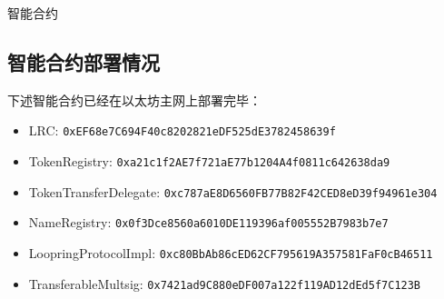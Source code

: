 \documentclass[UTF8]{ctexart}
\makeatletter
\newenvironment{figurehere}
 {\def\@captype{figure}}
 {}
\makeatother
\begin{document}
\begin{appendices}
\begin{center}
\begin{figurehere}
\caption{智能合约}
\label{fig:smartcontracts}
\end{figurehere}
\end{center}

\subsection{智能合约部署情况}

下述智能合约已经在以太坊主网上部署完毕：
\begin{itemize}
\item LRC: \verb|0xEF68e7C694F40c8202821eDF525dE3782458639f|
\item TokenRegistry: \verb|0xa21c1f2AE7f721aE77b1204A4f0811c642638da9|
\item TokenTransferDelegate: \verb|0xc787aE8D6560FB77B82F42CED8eD39f94961e304|
\item NameRegistry: \verb|0x0f3Dce8560a6010DE119396af005552B7983b7e7|
\item LoopringProtocolImpl: \verb|0xc80BbAb86cED62CF795619A357581FaF0cB46511|
\item TransferableMultsig: \verb|0x7421ad9C880eDF007a122f119AD12dEd5f7C123B|
\end{itemize}

\end{appendices}
\end{document}
